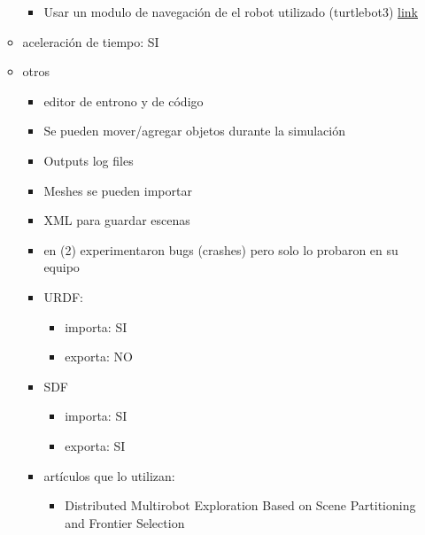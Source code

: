 \begin{itemize}
\begin{itemize}
\begin{itemize}
      \item Usar un modulo de navegación de el robot utilizado (turtlebot3) \href{https://newscrewdriver.com/2018/08/12/turtlebot3-demo-navigating-gazebo-simulation-world/}{link}  
    \end{itemize}
    \item aceleración de tiempo:          SI
    \item otros
    \begin{itemize}
      \item editor de entrono y de código
      \item Se pueden mover/agregar objetos durante la simulación
      \item Outputs log files
      \item Meshes se pueden importar
      \item XML para guardar escenas
      \item en (2) experimentaron bugs (crashes) pero solo lo probaron en su equipo
      \item URDF:
      \begin{itemize}
        \item importa:                       SI
        \item exporta:                      NO 
      \end{itemize}
      \item SDF
      \begin{itemize}
        \item importa:                       SI
        \item exporta:                      SI
      \end{itemize}
      \item artículos que lo utilizan:
      \begin{itemize}
        \item Distributed Multirobot Exploration Based on Scene Partitioning and Frontier Selection
      \end{itemize}
    \end{itemize}
  \end{itemize}


\end{itemize}
